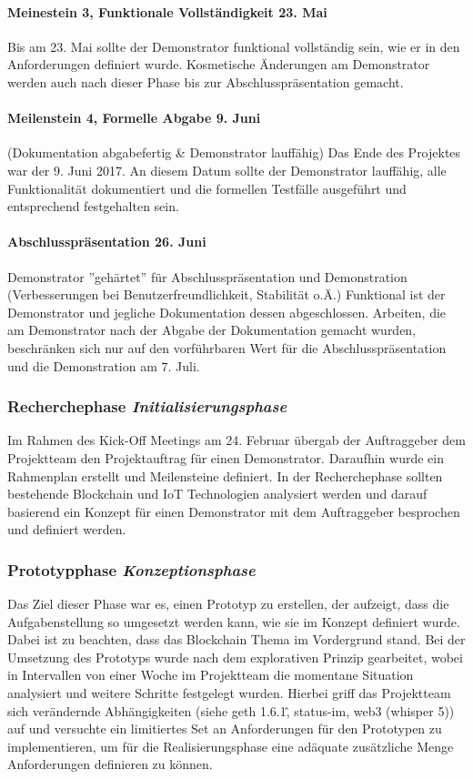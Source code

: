 \paragraph{Meinestein 3, Funktionale Vollständigkeit 23. Mai}
Bis am 23. Mai sollte der Demonstrator funktional vollständig sein, wie er in den Anforderungen definiert wurde. Kosmetische Änderungen am Demonstrator werden auch nach dieser Phase bis zur Abschlusspräsentation gemacht.

\paragraph{Meilenstein 4, Formelle Abgabe 9. Juni}
(Dokumentation abgabefertig \& Demonstrator lauffähig) Das Ende des Projektes war der 9. Juni 2017. An diesem Datum sollte der Demonstrator lauffähig, alle Funktionalität dokumentiert und die formellen Testfälle ausgeführt und entsprechend festgehalten sein.

\paragraph{Abschlusspräsentation 26. Juni}
Demonstrator ''gehärtet'' für Abschlusspräsentation und Demonstration (Verbesserungen bei Benutzerfreundlichkeit, Stabilität o.Ä.)
Funktional ist der Demonstrator und jegliche Dokumentation dessen abgeschlossen. Arbeiten, die am Demonstrator nach der Abgabe der Dokumentation gemacht wurden, beschränken sich nur auf den vorführbaren Wert für die Abschlusspräsentation und die Demonstration am 7. Juli.

\subsubsection{Recherchephase \emph{Initialisierungsphase}}
\label{pm_subsubsec:Recherchephase}
Im Rahmen des Kick-Off Meetings am 24. Februar übergab der Auftraggeber dem Projektteam den Projektauftrag für einen Demonstrator. Daraufhin wurde ein Rahmenplan erstellt und Meilensteine definiert. In der Recherchephase sollten bestehende Blockchain und IoT Technologien analysiert werden und darauf basierend ein Konzept für einen Demonstrator mit dem Auftraggeber besprochen und definiert werden.

\subsubsection{Prototypphase \emph{Konzeptionsphase}}
\label{pm_subsubsec:Prototypphase}
Das Ziel dieser Phase war es, einen Prototyp zu erstellen, der aufzeigt, dass die Aufgabenstellung so umgesetzt werden kann, wie sie im Konzept definiert wurde. Dabei ist zu beachten, dass das Blockchain Thema im Vordergrund stand. Bei der Umsetzung des Prototyps wurde nach dem explorativen Prinzip gearbeitet, wobei in Intervallen von einer Woche im Projektteam die momentane Situation analysiert und weitere Schritte festgelegt wurden. Hierbei griff das Projektteam sich verändernde Abhängigkeiten (siehe geth 1.6.1\^, status-im, web3 (whisper 5)) auf und versuchte ein limitiertes Set an Anforderungen für den Prototypen zu implementieren, um für die Realisierungsphase eine adäquate zusätzliche Menge Anforderungen definieren zu können.

